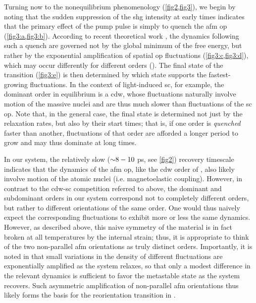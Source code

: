 Turning now to the nonequilibrium phenomenology (\cref{fig2,fig3}), we begin by noting that the sudden suppression of the \gls{shg} intensity at early times indicates that the primary effect of the pump pulse is simply to quench the \gls{afm} \gls{op} (\cref{fig3:a,fig3:b}).
According to recent theoretical work \citep{sun_transient_2020, dolgirev_self-similar_2020}, the dynamics following such a quench are governed not by the global minimum of the free energy, but rather by the exponential amplification of spatial \gls{op} fluctuations (\cref{fig3:c,fig3:d}), which may occur differently for different orders ().
The final state of the transition (\cref{fig3:e}) is then determined by which state supports the fastest-growing fluctuations.
In the context of light-induced \gls{sc}\citep{fausti_light-induced_2011,cremin_photoenhanced_2019}, for example, the dominant order in equilibrium is a \gls{cdw}, whose fluctuations naturally involve motion of the massive nuclei and are thus much slower than fluctuations of the \gls{sc} \gls{op}\citep{smallwood_tracking_2012,sun_transient_2020}.
Note that, in the general case, the final state is determined not just by the relaxation rates, but also by their start times; that is, if one order is \textit{quenched} faster than another, fluctuations of that order are afforded a longer period to grow and may thus dominate at long times.

In our system, the relatively slow (${\sim} 8-10$ \si{ps}, see \cref{fig2}) recovery timescale indicates that the dynamics of the \gls{afm} \gls{op}, like the \gls{cdw} order of \citet{fausti_light-induced_2011}, also likely involve motion of the atomic nuclei (i.e. magnetoelastic coupling).
However, in contrast to the \gls{cdw}-\gls{sc} competition referred to above, the dominant and subdominant orders in our system correspond not to completely different orders, but rather to different orientations of the same order.
One would thus naively expect the corresponding fluctuations to exhibit more or less the same dynamics.
However, as described above, this naive symmetry of the material is in fact broken at all temperatures by the internal strain; thus, it is appropriate to think of the two non-parallel \gls{afm} orientations as truly distinct orders.
Importantly, it is noted in \citet{sun_transient_2020} that small variations in the density of different fluctuations are exponentially amplified as the system relaxes, so that only a modest difference in the relevant dynamics is sufficient to favor the metastable state as the system recovers.
Such asymmetric amplification of non-parallel \gls{afm} orientations thus likely forms the basis for the reorientation transition in \cmb.

